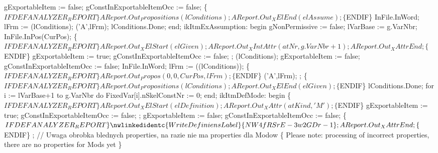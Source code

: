             gExportableItem := false;
            gConstInExportableItemOcc := false;
            \{$IFDEF ANALYZER_REPORT\}
            AReport.Out_Propositions(lConditions);
            AReport.Out_XElEnd(elAssume);
            \{$ENDIF\}
            InFile.InWord;
            lFrm := (lConditions);
            ('A',lFrm);
            lConditions.Done;
         end;
      ikItmExAssumption:
         begin
            gNonPermissive := false;
            lVarBase := g.VarNbr;
            InFile.InPos(CurPos);
            \{$IFDEF ANALYZER_REPORT\}
            AReport.Out_XElStart(elGiven);
            AReport.Out_XIntAttr(atNr, g.VarNbr+1);
            AReport.Out_XAttrEnd;
            \{$ENDIF\}
            gExportableItem := true;
            gConstInExportableItemOcc := false;
            ;
            (lConditions);
            gExportableItem := false;
            gConstInExportableItemOcc := false;
            InFile.InWord;
            lFrm := ((lConditions));
            \{$IFDEF ANALYZER_REPORT\}
            AReport.Out_Propos(0, 0, CurPos, lFrm);
            \{$ENDIF\}
            ('A',lFrm);
            ;
            \{$IFDEF ANALYZER_REPORT\}
            AReport.Out_Propositions(lConditions);
            AReport.Out_XElEnd(elGiven);
            \{$ENDIF\}
            lConditions.Done;
            for i := lVarBase+1 to g.VarNbr do FixedVar[i].nSkelConstNr := 0;
         end;
      ikItmDefMode:
         begin
            \{$IFDEF ANALYZER_REPORT\}
            AReport.Out_XElStart(elDefinition);
            AReport.Out_XAttr(atKind, 'M');
            \{$ENDIF\}
            gExportableItem := true;
            gConstInExportableItemOcc := false;
            ;
            gExportableItem := false;
            gConstInExportableItemOcc := false;
            \{$IFDEF ANALYZER_REPORT\}
            \nwlinkedidentc{WriteDefiniensLabel}{NW4fRSrE-3w2GDr-1};
            AReport.Out_XAttrEnd;
            \{$ENDIF\}
            ;
            //   Uwaga obrobka blednych properties, na razie nie ma properties dla Modow
            \{ Please note: processing of incorrect properties, there are no properties for Mods yet \}
